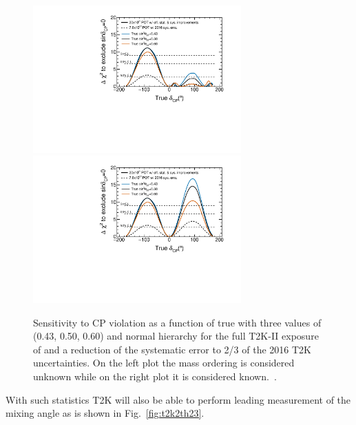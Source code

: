 \begin{figure} [htbp!]
\begin{center}
\includegraphics[width=8cm]{figures/t2kpre_dcp_point1_100k4check_100ksensi_wreactorthrow_optv2s13off_truedcp_unknownMH_fakesyst_lohidcpExclusive.pdf}
\includegraphics[width=8cm]{figures/t2kpre_dcp_point1_100k4check_100ksensi_wreactorthrow_optv2s13off_truedcp_fakesyst_lohidcpExclusive.pdf}
\caption{\label{fig:t2k2sensi} Sensitivity to CP violation as a function of true
\dcp with three values of \stt (0.43, 0.50, 0.60) and normal hierarchy for the full T2K-II exposure of \twopott and a reduction of the systematic error to 2/3 of the 2016 T2K uncertainties. On the left plot the mass ordering is considered unknown while on the right plot it is considered known.~\cite{Abe:2016tez}.}
\end{center}
\end{figure}

With such statistics T2K will also be able to perform leading measurement of the \stt mixing angle as is shown in Fig.~\ref{fig:t2k2th23}.

